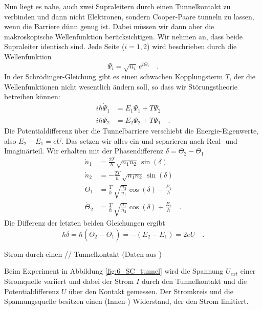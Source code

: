 Nun liegt es nahe, auch zwei Supraleitern durch einen Tunnelkontakt zu verbinden und dann nicht Elektronen, sondern Cooper-Paare tunneln zu lassen, wenn die Barriere dünn genug ist. Dabei müssen wir dann aber die makroskopische Wellenfunktion berücksichtigen. Wir nehmen an, dass beide Supraleiter identisch sind. Jede Seite ($i=1, 2$) wird beschrieben durch die Wellenfunktion 
\begin{equation}
  \Psi_i = \sqrt{n_i} \, e^{i \Theta_i} \quad .
\end{equation}
In der Schrödinger-Gleichung gibt es einen schwachen Kopplungsterm $T$, der die Wellenfunktionen nicht wesentlich ändern soll, so dass wir Störungstheorie betreiben können:
\begin{align}
    i \hbar \dot{\Psi}_1 & =  E_1 \Psi_1 + T \Psi_2 \\ 
    i \hbar \dot{\Psi}_2 & =  E_2 \Psi_2 + T \Psi_1 \quad .
\end{align}
Die Potentialdifferenz über die Tunnelbarriere verschiebt die Energie-Eigenwerte, also $E_2 - E_1 = e U$. Das setzen wir alles ein und separieren nach Real- und Imaginärteil. Wir erhalten mit der Phasendifferenz $\delta = \Theta_2 - \Theta_1$
\begin{align}
    \dot{n}_1 & = \frac{2 T}{\hbar} \, \sqrt{n_1 n_2} \,  \sin(\delta) \\
    \dot{n}_2 & = -\frac{2 T}{\hbar} \, \sqrt{n_1 n_2} \,  \sin(\delta) \\
    \dot{\Theta}_1 &= \frac{T}{\hbar} \, \sqrt{\frac{n_2}{n_1}} \cos(\delta) - \frac{E_1}{\hbar} \\
    \dot{\Theta}_2 &= \frac{T}{\hbar} \, \sqrt{\frac{n_1}{n_2}} \cos(\delta) + \frac{E_2}{\hbar} \quad .
\end{align} 
Die Differenz der letzten beiden Gleichungen ergibt
\begin{equation}
   \hbar \dot{\delta} =  \hbar ( \dot{\Theta}_2 -  \dot{\Theta}_1 ) = - (E_2 - E_1) = 2eU \quad .
\end{equation}


\begin{marginfigure}
    \caption{Strom durch einen // Tunnelkontakt (Daten aus \cite{Langenberg1966})
    \label{fig:6_SC_tunnel}}
\end{marginfigure}


Beim Experiment in Abbildung \ref{fig:6_SC_tunnel} wird die Spannung $U_{ext}$ einer Stromquelle variiert und dabei der Strom $I$ durch den Tunnelkontakt und die Potentialdifferenz $U$ über den Kontakt gemessen. Der Stromkreis und die Spannungsquelle besitzen einen (Innen-) Widerstand, der den Strom limitiert.

